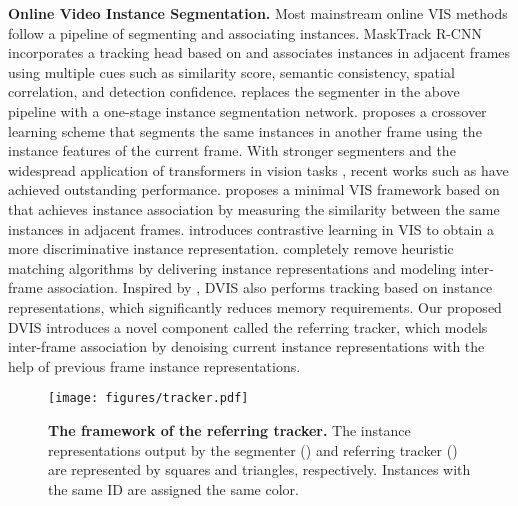\documentclass[10pt,twocolumn,letterpaper]{article}
\begin{document}
\textbf{Online Video Instance Segmentation.} Most mainstream online VIS methods follow a pipeline of segmenting and associating instances. MaskTrack R-CNN \cite{masktrackrcnn} incorporates a tracking head based on \cite{maskrcnn} and associates instances in adjacent frames using multiple cues such as similarity score, semantic consistency, spatial correlation, and detection confidence. \cite{sipmask} replaces the segmenter in the above pipeline with a one-stage instance segmentation network. \cite{crossvis} proposes a crossover learning scheme that segments the same instances in another frame using the instance features of the current frame. With stronger segmenters and the widespread application of transformers in vision tasks \cite{mask2former,detr}, recent works such as \cite{minvis,idol} have achieved outstanding performance. \cite{minvis} proposes a minimal VIS framework based on \cite{mask2former} that achieves instance association by measuring the similarity between the same instances in adjacent frames. \cite{idol} introduces contrastive learning in VIS to obtain a more discriminative instance representation. \cite{rovis,genvis} completely remove heuristic matching algorithms by delivering instance representations and modeling inter-frame association. Inspired by \cite{efficientvis, genvis, minvis, TrackFormer}, DVIS also performs tracking based on instance representations, which significantly reduces memory requirements. Our proposed DVIS introduces a novel component called the referring tracker, which models inter-frame association by denoising current instance representations with the help of previous frame instance representations.
\begin{figure*}[t]
\begin{center}
\texttt{[image: figures/tracker.pdf]}\vspace{-2mm}
\end{center}
\caption{\textbf{The framework of the referring tracker.} The instance representations output by the segmenter () and referring tracker () are represented by squares and triangles, respectively. Instances with the same ID are assigned the same color.}\vspace{-3mm}
\label{fig:online_tracker}
\end{figure*}
\end{document}
